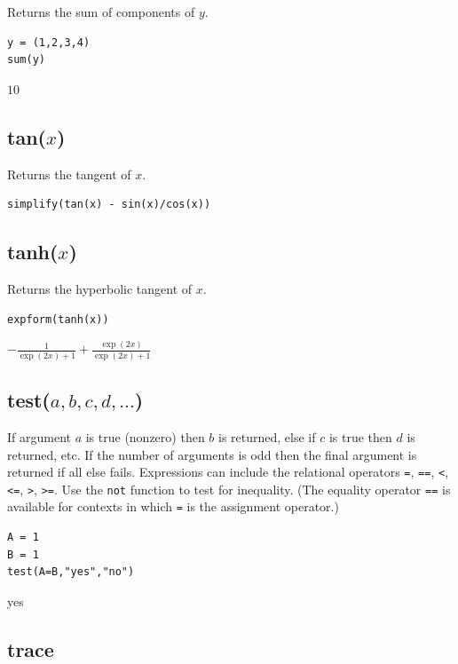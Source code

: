 \documentclass[12pt]{article}
\begin{document}
Returns the sum of components of $y$.

{\color{blue}
\begin{verbatim}
y = (1,2,3,4)
sum(y)
\end{verbatim}
}

\noindent
$10$

\subsection*{tan($x$)}

Returns the tangent of $x$.

{\color{blue}
\begin{verbatim}
simplify(tan(x) - sin(x)/cos(x))
\end{verbatim}
}


\subsection*{tanh($x$)}

Returns the hyperbolic tangent of $x$.

{\color{blue}
\begin{verbatim}
expform(tanh(x))
\end{verbatim}
}

\noindent
$\displaystyle -\frac{1}{\exp(2x)+1}+\frac{\exp(2x)}{\exp(2x)+1}$

\subsection*{test($a,b,c,d,\ldots$)}

If argument $a$ is true (nonzero) then $b$ is returned, else if $c$ is true then $d$ is returned, etc.
If the number of arguments is odd then the final argument is returned if all else fails.
Expressions can include the relational operators
\verb$=$,
\verb$==$,
\verb$<$,
\verb$<=$,
\verb$>$,
\verb$>=$.
Use the
\verb$not$
function to test for inequality.
(The equality operator
\verb$==$
is available for contexts in which
\verb$=$
is the assignment operator.)

{\color{blue}
\begin{verbatim}
A = 1
B = 1
test(A=B,"yes","no")
\end{verbatim}
}

\noindent
yes

\subsection*{trace}
\end{document}
